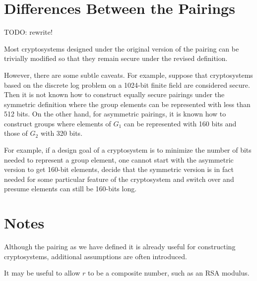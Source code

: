 \section{Differences Between the Pairings}

TODO: rewrite!

Most cryptosystems designed under the original version of the pairing can
be trivially modified so that they remain secure under the revised
definition.

However, there are some subtle caveats. For example, suppose that
cryptosystems based on the discrete log problem on a 1024-bit finite field
are considered
secure. Then it is not known how to construct equally secure pairings
under the symmetric definition where the group elements can be represented
with less than 512 bits. On the other hand, for asymmetric pairings,
it is known how to construct groups where elements of $G_1$ can be
represented with 160 bits and those of $G_2$ with 320 bits.

For example, if a design goal of a cryptosystem is to minimize the
number of bits needed to represent a group element,
one cannot start with the asymmetric version to get
160-bit elements, decide that the symmetric version is in fact needed for
some particular feature of the cryptosystem and switch over and presume
elements can still be 160-bits long.

\section{Notes}

Although the pairing as we have defined it is already useful for constructing
cryptosystems, additional assumptions are often introduced.

It may be useful to allow $r$ to be a composite number,
such as an RSA modulus.
